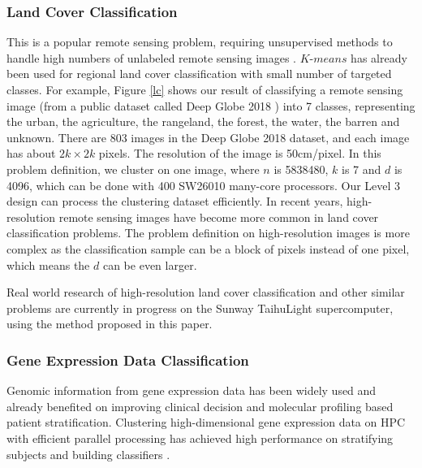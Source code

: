 \documentclass[10pt,journal,compsoc]{IEEEtran}
\begin{document}
\subsubsection{Land Cover Classification}
This is a popular remote sensing problem, requiring unsupervised methods to handle high numbers of unlabeled remote sensing images \cite{li2016stacked}.
$K$-$means$ has already been used for regional land cover classification with small number of targeted classes. For example, Figure \ref{lc} shows our result of classifying a remote sensing image (from a public dataset called Deep Globe 2018 \cite{demir2018deepglobe}) into 7 classes, representing the urban, the agriculture, the rangeland, the forest, the water, the barren and unknown. There are 803 images in the Deep Globe 2018 dataset, and each image has about $2k \times 2k$ pixels. The resolution of the image is 50cm/pixel. In this problem definition, we cluster on one image, where $n$ is 5838480, $k$ is 7 and $d$ is 4096, which can be done with 400 SW26010 many-core processors. Our Level 3 design can process the clustering dataset efficiently. 
In recent years, high-resolution remote sensing images have become more common in land cover classification problems. The problem definition on high-resolution images is more complex as the classification sample can be a block of pixels instead of one pixel, which means the $d$ can be even larger.

Real world research of high-resolution land cover classification and other similar problems are currently in progress on the Sunway TaihuLight supercomputer, using the method proposed in this paper. 

\subsubsection{Gene Expression Data Classification}
Genomic information from gene expression data has been widely used and already benefited on improving clinical decision and molecular profiling based patient stratification. Clustering high-dimensional gene expression data on HPC with efficient parallel processing has achieved high performance on stratifying subjects and building classifiers \cite{wang2014optimising}. 
\end{document}
